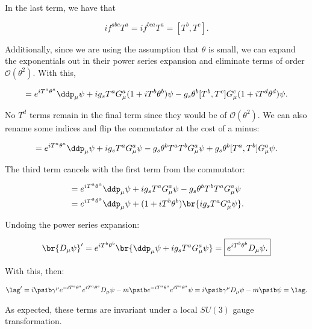 In the last term, we have that

\begin{equation}
  if^{abc}T^a = if^{bca}T^a = [T^b,T^c].
\end{equation}

Additionally, since we are using the assumption that $\theta$ is small, we can expand the exponentials out in their power series expansion and eliminate terms of order $\mathcal{O}(\theta^2)$. With this,

\begin{equation}
  = e^{iT^a\theta^a}\ddp_\mu\psi + ig_s T^aG^a_\mu (1 + iT^b\theta^b)\psi - g_s \theta^b [T^b,T^c] G^c_\mu (1 + iT^d\theta^d)\psi.
\end{equation}

No $T^d$ terms remain in the final term since they would be of $\mathcal{O}(\theta^2)$. We can also rename some indices and flip the commutator at the cost of a minus:

\begin{equation}
  = e^{iT^a\theta^a}\ddp_\mu\psi + ig_s T^aG^a_\mu\psi - g_s\theta^b T^aT^b G^a_\mu \psi + g_s \theta^b [T^a,T^b] G^a_\mu\psi.
\end{equation}

The third term cancels with the first term from the commutator:

\begin{align}
  &= e^{iT^a\theta^a}\ddp_\mu\psi + ig_s T^aG^a_\mu\psi - g_s\theta^bT^b T^aG^a_\mu \psi \\
  &= e^{iT^a\theta^a}\ddp_\mu\psi + (1 + iT^b\theta^b)\br{ig_s T^aG^a_\mu\psi}.
\end{align}

Undoing the power series expansion:

\begin{equation}
  \br{D_\mu\psi}' = e^{iT^b\theta^b}\br{\ddp_\mu\psi + ig_sT^aG^a_\mu\psi} = \boxed{e^{iT^b\theta^b}D_\mu\psi.}
\end{equation}

With this, then:


\begin{align}
  \lag^{\prime} = i\psib \gamma^\mu e^{-iT^a\theta^a} e^{iT^a\theta^a} D_\mu \psi - m\psib e^{-iT^a\theta^a} e^{iT^a\theta^a} \psi = i\psib \gamma^\mu D_\mu \psi - m\psib\psi = \lag.
\end{align}

As expected, these terms are invariant under a local $SU(3)$ gauge transformation.



